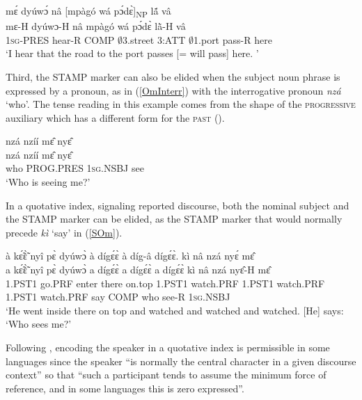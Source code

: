 \begin{exe} 
\ex\label{OmNN} 
  \glll  mɛ́ dyúwɔ́ nâ [mpàgó wá pɔ́dɛ̀]\textsubscript{NP} lã́ vâ \\
        mɛ-H dyúwɔ-H nâ mpàgó wá pɔ́dɛ̀ lã̀-H vâ \\
            1\textsc{sg}-PRES hear-R COMP $\emptyset$3.street 3:ATT $\emptyset$1.port pass-R here \\
    \trans `I hear that the road to the port passes [= will pass] here. '
\end{exe}

Third, the STAMP marker can also be elided when the subject noun phrase is expressed by a pronoun, as in (\ref{OmInterr}) with the interrogative pronoun {\itshape nzá} `who'. The tense reading in this example comes from the shape of the \textsc{progressive} auxiliary which has a different form for the \textsc{past} ().


\begin{exe} 
\ex\label{OmInterr}
  \glll nzá nzíí mɛ̂ nyɛ̂ \\
    nzá nzíí mɛ̂ nyɛ̂ \\
         who PROG.PRES 1\textsc{sg}.NSBJ see\\
    \trans `Who is seeing me?'
\end{exe}



In a quotative index, signaling reported discourse, both the nominal subject and the STAMP marker can be elided, as the STAMP marker that would normally precede {\itshape kì} `say' in (\ref{SOm}).


\begin{exe} 
\exN\label{SOm} 
  \glll à kɛ̃́ɛ̃̀ nyî pɛ̀ dyúwɔ̀ à dígɛ́ɛ̀ à díg-â dígɛ́ɛ̀. kì nâ nzá nyɛ́ mɛ̂ \\
        a kɛ̃́ɛ̃̀ nyî pɛ̀ dyúwɔ̀ a dígɛ́ɛ̀ a dígɛ́ɛ̀ a dígɛ́ɛ̀ kì nâ nzá nyɛ̂-H mɛ̂ \\
       1.PST1 go.PRF enter there on.top 1.PST1 watch.PRF 1.PST1 watch.PRF 1.PST1 watch.PRF say COMP who see-R 1\textsc{sg}.NSBJ  \\
    \trans `He went inside there on top and watched and watched and watched. [He] says: `Who sees me?'
\end{exe}

\noindent Following \citet[105]{guldemann2008}, encoding the speaker in a quotative index is permissible in some languages since the speaker ``is normally the central character in a given discourse context'' so that ``such a participant tends to assume the minimum force of reference, and in some languages this is zero expressed''.

